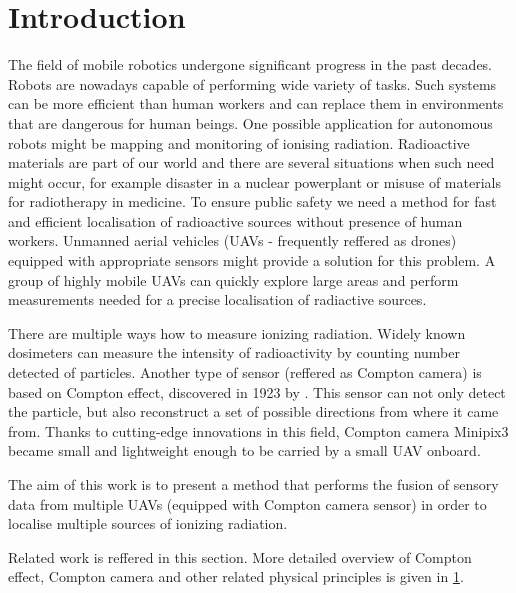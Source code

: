 
\chapter{Introduction\label{chap:introduction}}
The field of mobile robotics undergone significant progress in the past decades.
Robots are nowadays capable of performing wide variety of tasks. 
Such  systems can be more efficient than human workers and can replace them in environments that are dangerous for human beings.
One possible application for autonomous robots might be mapping and monitoring of ionising radiation. 
Radioactive materials are part of our world and there are several situations when such need might occur, for example disaster in a nuclear powerplant or misuse of materials for radiotherapy in medicine. 
To ensure public safety we need a method for fast and efficient localisation of radioactive sources without presence of human workers.
Unmanned aerial vehicles (\ac{UAV}s - frequently reffered as drones) equipped with appropriate sensors might provide a solution for this problem.
A group of highly mobile \ac{UAV}s can quickly explore large areas and perform measurements needed for a precise localisation of radiactive sources.

There are multiple ways how to measure ionizing radiation.
Widely known dosimeters can measure the intensity of radioactivity by counting number detected of particles.
Another type of sensor (reffered as Compton camera) is based on Compton effect, discovered in 1923 by \cite{compton}.
This sensor can not only detect the particle, but also reconstruct a set of possible directions from where it came from.
Thanks to cutting-edge innovations in this field, Compton camera Minipix3 became small and lightweight enough to be carried by a small \ac{UAV} onboard.

The aim of this work is to present a method that performs the fusion of sensory data from multiple \ac{UAV}s (equipped with Compton camera sensor) in order to localise multiple sources of ionizing radiation.

Related work is reffered in this section.
More detailed overview of Compton effect, Compton camera and other related physical principles is given in \ref{}.



